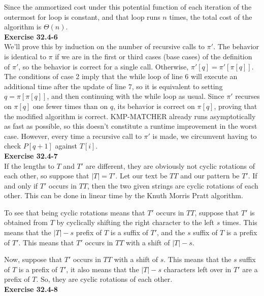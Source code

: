 \documentclass{article}
\begin{document}
Since the ammortized cost under this potential function of each iteration of the outermost for loop is constant, and that loop runs $n$ times, the total cost of the algorithm is $\Theta(n)$.\\

\noindent\textbf{Exercise 32.4-6}\\

We'll prove this by induction on the number of recursive calls to $\pi'$.  The behavior is identical to $\pi$ if we are in the first or third cases (base cases) of the definition of $\pi'$, so the behavior is correct for a single call. Otherwise, $\pi'[q] = \pi'[\pi[q]]$.  The conditions of case 2 imply that the while loop of line 6 will execute an additional time after the update of line 7, so it is equivalent to setting $q = \pi[\pi[q]]$, and then continuing with the while loop as usual.  Since $\pi'$ recurses on $\pi[q]$ one fewer times than on $q$, its behavior is correct on $\pi[q]$, proving that the modified algorithm is correct.   KMP-MATCHER already runs asymptotically as fast as possible, so this doesn't constitute a runtime improvement in the worst case.  However, every time a recursive call to $\pi'$ is made, we circumvent having to check $P[q+1]$ against $T[i]$.\\

\noindent\textbf{Exercise 32.4-7}\\

If the lengths to $T$ and $T'$ are different, they are obviously not cyclic rotations of each other, so suppose that $|T|=T'$. Let our text be $TT$ and our pattern be $T'$. If and only if $T'$ occurs in $TT$, then the two given strings are cyclic rotations of each other. This can be done in linear time by the Knuth Morris Pratt algorithm.

To see that being cyclic rotations means that $T'$ occurs in $TT$, suppose that $T'$ is obtained from $T$ by cyclically shifting the right character to the left $s$ times. This means that the $|T|-s$ prefix of $T$ is a suffix of $T'$, and the $s$ suffix of $T$ is a prefix of $T'$. This means that $T'$ occurs in $TT$ with a shift of $|T|-s$.

Now, suppose that $T'$ occurs in $TT$ with a shift of $s$. This means that the $s$ suffix of $T$ is a prefix of $T'$, it also means that the $|T|-s$ characters left over in $T'$ are a prefix of $T$. So, they are cyclic rotations of each other.\\

\noindent\textbf{Exercise 32.4-8}\\
\end{document}
